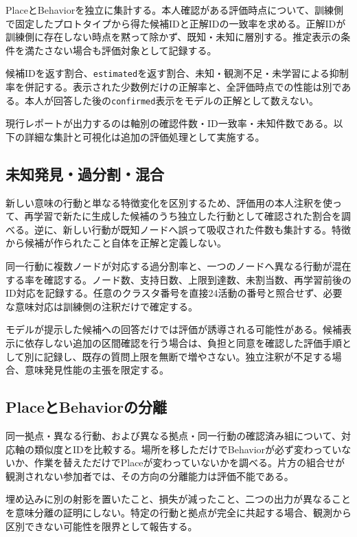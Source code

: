 PlaceとBehaviorを独立に集計する。本人確認がある評価時点について、訓練側で固定したプロトタイプから得た候補IDと正解IDの一致率を求める。正解IDが訓練側に存在しない時点を黙って除かず、既知・未知に層別する。推定表示の条件を満たさない場合も評価対象として記録する。

候補IDを返す割合、\texttt{estimated}を返す割合、未知・観測不足・未学習による抑制率を併記する。表示された少数例だけの正解率と、全評価時点での性能は別である。本人が回答した後の\texttt{confirmed}表示をモデルの正解として数えない。

現行レポートが出力するのは軸別の確認件数・ID一致率・未知件数である。以下の詳細な集計と可視化は追加の評価処理として実施する。

\subsection{未知発見・過分割・混合}

新しい意味の行動と単なる特徴変化を区別するため、評価用の本人注釈を使って、再学習で新たに生成した候補のうち独立した行動として確認された割合を調べる。逆に、新しい行動が既知ノードへ誤って吸収された件数も集計する。特徴から候補が作られたこと自体を正解と定義しない。

同一行動に複数ノードが対応する過分割率と、一つのノードへ異なる行動が混在する率を確認する。ノード数、支持日数、上限到達数、未割当数、再学習前後のID対応を記録する。任意のクラスタ番号を直接24活動の番号と照合せず、必要な意味対応は訓練側の注釈だけで確定する。

モデルが提示した候補への回答だけでは評価が誘導される可能性がある。候補表示に依存しない追加の区間確認を行う場合は、負担と同意を確認した評価手順として別に記録し、既存の質問上限を無断で増やさない。独立注釈が不足する場合、意味発見性能の主張を限定する。

\subsection{PlaceとBehaviorの分離}

同一拠点・異なる行動、および異なる拠点・同一行動の確認済み組について、対応軸の類似度とIDを比較する。場所を移しただけでBehaviorが必ず変わっていないか、作業を替えただけでPlaceが変わっていないかを調べる。片方の組合せが観測されない参加者では、その方向の分離能力は評価不能である。

埋め込みに別の射影を置いたこと、損失が減ったこと、二つの出力が異なることを意味分離の証明にしない。特定の行動と拠点が完全に共起する場合、観測から区別できない可能性を限界として報告する。

